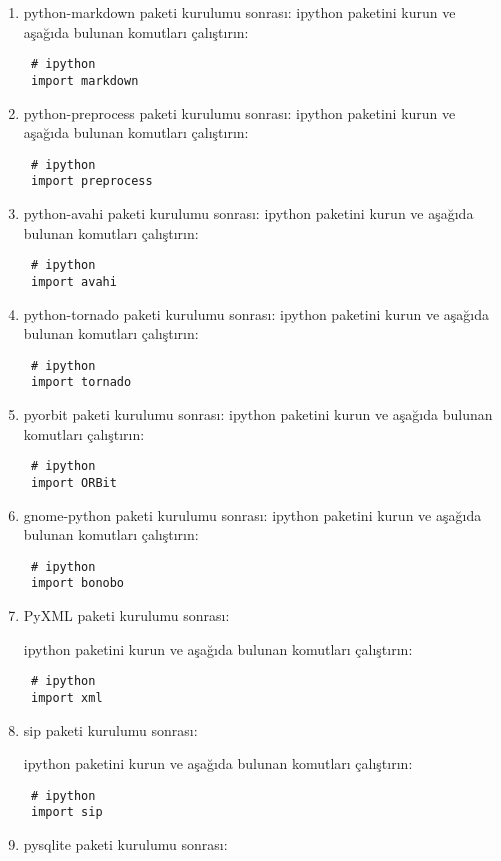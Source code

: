 \documentclass[a4paper,10pt]{article}
\begin{document}
\begin{enumerate}
\item python-markdown paketi kurulumu sonrası:
ipython paketini kurun ve aşağıda bulunan komutları çalıştırın:
\begin{verbatim}
 # ipython
 import markdown
\end{verbatim}

\item python-preprocess paketi kurulumu sonrası:
ipython paketini kurun ve aşağıda bulunan komutları çalıştırın:
\begin{verbatim}
 # ipython
 import preprocess
\end{verbatim}

\item python-avahi paketi kurulumu sonrası:
ipython paketini kurun ve aşağıda bulunan komutları çalıştırın:
\begin{verbatim}
 # ipython
 import avahi
\end{verbatim}

\item python-tornado paketi kurulumu sonrası:
ipython paketini kurun ve aşağıda bulunan komutları çalıştırın:
\begin{verbatim}
 # ipython
 import tornado
\end{verbatim}

\item pyorbit paketi kurulumu sonrası:
ipython paketini kurun ve aşağıda bulunan komutları çalıştırın:
\begin{verbatim}
 # ipython
 import ORBit
\end{verbatim}

\item gnome-python paketi kurulumu sonrası:
ipython paketini kurun ve aşağıda bulunan komutları çalıştırın:
\begin{verbatim}
 # ipython
 import bonobo
\end{verbatim}


\item PyXML paketi kurulumu sonrası:

ipython paketini kurun ve aşağıda bulunan komutları çalıştırın:
\begin{verbatim}
 # ipython
 import xml
\end{verbatim}

\item sip paketi kurulumu sonrası:

ipython paketini kurun ve aşağıda bulunan komutları çalıştırın:
\begin{verbatim}
 # ipython
 import sip
\end{verbatim}
\item pysqlite paketi kurulumu sonrası:


\end{enumerate}
\end{document}
